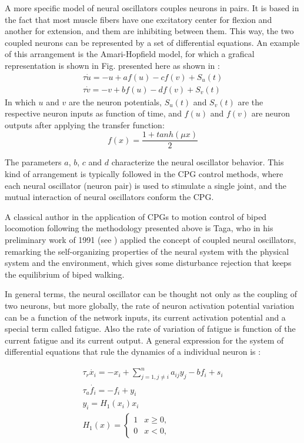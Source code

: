 A more specific model of neural oscillators couples neurons in pairs. It is based in the fact that most muscle fibers have one excitatory center for flexion and another for extension, and them are inhibiting between them. This way, the two coupled neurons can be represented by a set of differential equations. An example of this arrangement is the Amari-Hopfield model, for which a grafical representation is shown in Fig. presented here as shown in \cite{Nakada2003}:
\begin{eqnarray}
\tau\dot{u}=-u+af(u)-cf(v)+S_u(t) \\
\tau\dot{v}=-v+bf(u)-df(v)+S_v(t)
\end{eqnarray}
In which $u$ and $v$ are the neuron potentials, $S_u(t)$ and $S_v(t)$ are the respective neuron inputs as function of time, and $f(u)$ and $f(v)$ are neuron outputs after applying the transfer function:
\begin{equation}
f(x)=\frac{1+tanh(\mu x)}{2}
\end{equation}


The parameters $a$, $b$, $c$ and $d$ characterize the neural oscillator behavior. This kind of arrangement is typically followed in the CPG control methods, where each neural oscillator (neuron pair) is used to stimulate a single joint, and the mutual interaction of neural oscillators conform the CPG. 


A classical author in the application of CPGs to motion control of biped locomotion following the methodology presented above is Taga, who in his preliminary work of 1991 (see \cite{Taga1991}) applied the concept of coupled neural oscillators, remarking the self-organizing properties of the neural system with the physical system and the environment, which gives some disturbance rejection that keeps the equilibrium of biped walking.
 

In general terms, the neural oscillator can be thought not only as the coupling of two neurons, but more globally, the rate of neuron activation potential variation can be a function of the network inputs, its current activation potential and a special term called fatigue. Also the rate of variation of fatigue is function of the current fatigue and its current output. A general expression for the system of differential equations that rule the dynamics of a individual neuron is \cite{Cao98design}:

\begin{eqnarray}
\tau_r\dot{x_i}=-x_i+\displaystyle\sum_{j=1,j\neq i}^n a_{ij}y_j-bf_i+s_i \\
\tau_a\dot{f_i}=-f_i+y_i \\
y_i=H_1(x_i)x_i \\
H_1(x)=\displaystyle\left\{ \begin{array}{cc}
1 & x\geq 0, \\
0 & x < 0, 
\end{array} \right.
\end{eqnarray}


